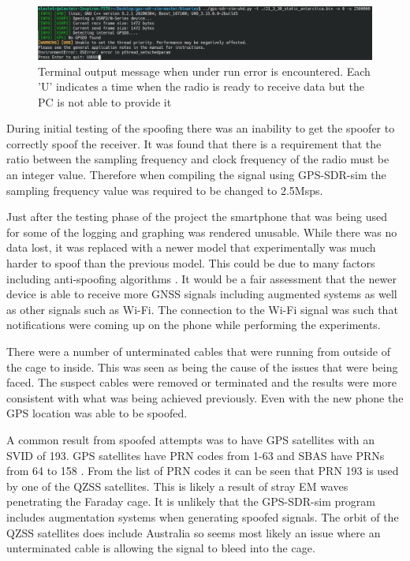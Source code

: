 \begin{figure}[!h]
    \begin{centering}
        \includegraphics[width=14cm,keepaspectratio]{Figures/underrun error.png}
        \caption{Terminal output message when under run error is encountered. Each 'U' indicates a time when the radio is ready to receive data but the PC is not able to provide it}
        \label{fig:underrun}
    \end{centering}
\end{figure}

During initial testing of the spoofing there was an inability to get the spoofer to correctly spoof the receiver. It was found that there is a requirement that the ratio
between the sampling frequency and clock frequency of the radio must be an integer value. Therefore when compiling the signal using GPS-SDR-sim the sampling frequency
value was required to be changed to 2.5Msps.  

Just after the testing phase of the project the smartphone that was being used for some of the logging and graphing was rendered unusable. While there was no data lost,
it was replaced with a newer model that experimentally was much harder to spoof than the previous model. This could be due to many factors including anti-spoofing
algorithms \cite{RN39}. It would be a fair assessment that the newer device is able to receive more GNSS signals including augmented systems as well as other signals such as Wi-Fi.
The connection to the Wi-Fi signal was such that notifications were coming up on the phone while performing the experiments.

There were a number of unterminated cables that were running from outside of the cage to inside. This was seen as being the cause of the issues that were being faced. The
suspect cables were removed or terminated and the results were more consistent with what was being achieved previously. Even with the new phone the GPS location was able
to be spoofed.

A common result from spoofed attempts was to have GPS satellites with an SVID of 193. GPS satellites have PRN codes from 1-63 and SBAS have PRNs from
64 to 158 \cite{RN67}. From the list of PRN codes \cite{RN67} it can be seen that PRN 193 is used by one of the QZSS satellites. This is likely a result of stray EM waves
penetrating the Faraday cage. It is unlikely that the GPS-SDR-sim program includes augmentation systems when generating spoofed signals. The orbit of the QZSS satellites
does include Australia so seems most likely an issue where an unterminated cable is allowing the signal to bleed into the cage.

